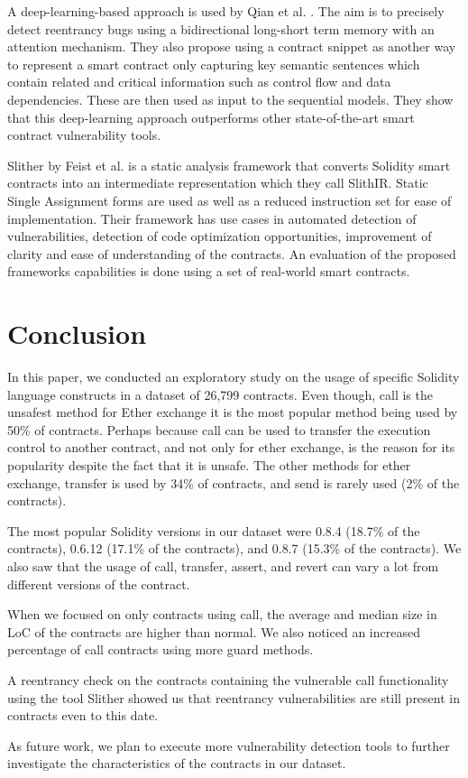 \documentclass[10pt,conference]{IEEEtran}
\newcommand{\totalContracts}{26,799\xspace}
\begin{document}
A deep-learning-based approach is used by Qian et al. \cite{automated}. The aim is to precisely detect reentrancy bugs using a bidirectional long-short term memory with an attention mechanism. They also propose using a contract snippet as another way to represent a smart contract only capturing key semantic sentences which contain related and critical information such as control flow and data dependencies. These are then used as input to the sequential models. They show that this deep-learning approach outperforms other state-of-the-art smart contract vulnerability tools.

Slither by Feist et al. \cite{slither} is a static analysis framework that converts Solidity smart contracts into an intermediate representation which they call SlithIR. Static Single Assignment forms are used as well as a reduced instruction set for ease of implementation. Their framework has use cases in automated detection of vulnerabilities, detection of code optimization opportunities, improvement of clarity and ease of understanding of the contracts. An evaluation of the proposed frameworks capabilities is done using a set of real-world smart contracts. 

\section{Conclusion}\label{sec:conclusion}

In this paper, we conducted an exploratory study on the usage of specific Solidity language constructs in a dataset of \totalContracts contracts. Even though, call is the unsafest method for Ether exchange it is the most popular method being used by 50\% of contracts. Perhaps because call can be used to transfer the execution control to another contract, and not only for ether exchange, is the reason for its popularity despite the fact that it is unsafe. The other methods for ether exchange, transfer is used by 34\% of contracts, and send is rarely used (2\% of the contracts).

The most popular Solidity versions in our dataset were 0.8.4 (18.7\% of the contracts), 0.6.12 (17.1\% of the contracts), and 0.8.7 (15.3\% of the contracts). We also saw that the usage of call, transfer, assert, and revert can vary a lot from different versions of the contract.

When we focused on only contracts using call, the average and median size in LoC of the contracts are higher than normal. We also noticed an increased percentage of call contracts using more guard methods.

A reentrancy check on the contracts containing the vulnerable call functionality using the tool Slither showed us that reentrancy vulnerabilities are still present in contracts even to this date.  

As future work, we plan to execute more vulnerability detection tools to further investigate the characteristics of the contracts in our dataset.






\end{document}
